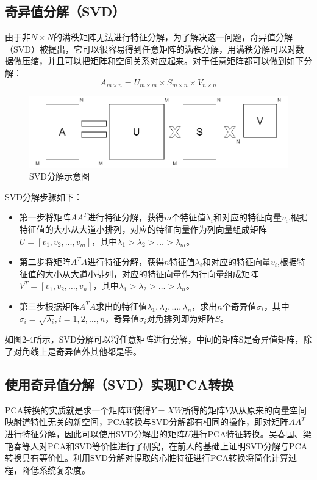 \subsection{奇异值分解（SVD）}
{
由于非$N\times N$的满秩矩阵无法进行特征分解，为了解决这一问题，奇异值分解（SVD）被提出\cite{ 1993Singular}，它可以很容易得到任意矩阵的满秩分解，用满秩分解可以对数据做压缩，并且可以把矩阵和空间关系对应起来\cite{1996A}。对于任意矩阵都可以做到如下分解：
}
\begin{equation}
    A_{m\times n}=U_{m\times m}\times S_{m\times n}\times V_{n\times n}
\end{equation}
\begin{figure}[htbp]
  \centering
  \includegraphics[width=1.0\linewidth]{images/svd.drawio.png}
  \caption{SVD分解示意图}\label{2-4} %
\end{figure}
\par
{SVD分解步骤如下：}
\begin{itemize}
    \item {第一步将矩阵$AA^{T}$进行特征分解，获得$m$个特征值$\lambda_i$和对应的特征向量$v_i$,根据特征值的大小从大道小排列，对应的特征向量作为列向量组成矩阵$U=[v_1,v_2,\dots,v_m]$，其中$\lambda_1>\lambda_2>\dots >\lambda_m$。}
    \item {第二步将矩阵$A^{T}A$进行特征分解，获得$n$特征值$\lambda_i$和对应的特征向量$v_i$,根据特征值的大小从大道小排列，对应的特征向量作为行向量组成矩阵$V^{T}=[v_1,v_2,\dots,v_n]$，其中$\lambda_1>\lambda_2>\dots >\lambda_n$。}
    \item {第三步根据矩阵$A^{T}A$求出的特征值$\lambda_1,\lambda_2,\dots,\lambda_n$，求出$n$个奇异值$\sigma_i$，其中$\sigma_i=\sqrt{\lambda_i},i=1,2,\dots,n$，奇异值$\sigma_i$对角排列即为矩阵$S$。}
\end{itemize}
\par
{如图2-4所示，SVD分解可以将任意矩阵进行分解，中间的矩阵S是奇异值矩阵，除了对角线上是奇异值外其他都是零。}
\subsection{使用奇异值分解（SVD）实现PCA转换}
{PCA转换的实质就是求一个矩阵$W$使得$Y=XW$所得的矩阵$Y$从从原来的向量空间映射道特性无关的新空间，PCA转换与SVD分解都有相同的操作，即对矩阵$AA^{T}$进行特征分解，因此可以使用SVD分解出的矩阵$U$进行PCA特征转换。吴春国、梁艳春等人对PCA和SVD等价性进行了研究\cite{2004wu}，在前人的基础上证明SVD分解与PCA转换具有等价性。利用SVD分解对提取的心脏特征进行PCA转换将简化计算过程，降低系统复杂度。}